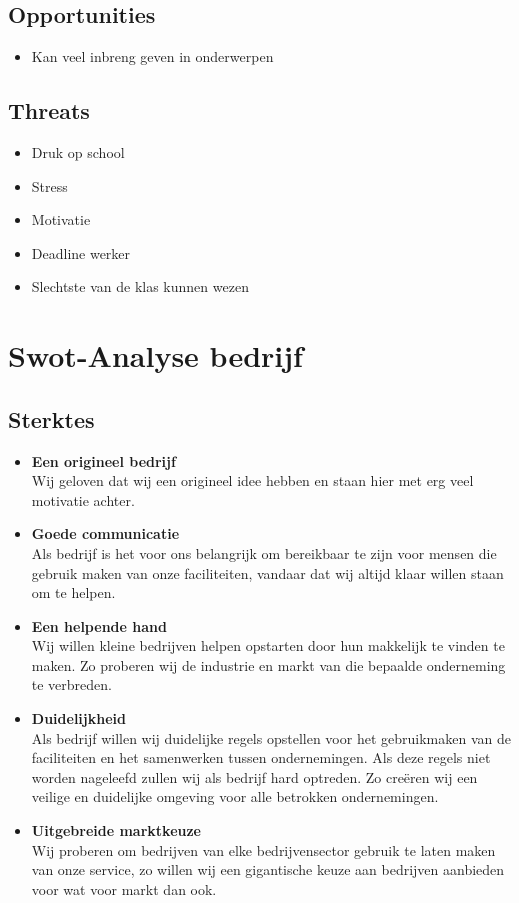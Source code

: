 \subsection{Opportunities}
\begin{itemize}
\item
  Kan veel inbreng geven in onderwerpen
\end{itemize}

\subsection{Threats}
\begin{itemize}
\item
  Druk op school
\item
  Stress
\item
  Motivatie
\item
  Deadline werker
\item
  Slechtste van de klas kunnen wezen
\end{itemize}

\section{Swot-Analyse bedrijf}

\subsection{Sterktes}
\begin{itemize}
\item {\bf Een origineel bedrijf} \\
  Wij geloven dat wij een origineel idee hebben en staan hier met erg veel motivatie achter.
\item {\bf Goede communicatie} \\
  Als bedrijf is het voor ons belangrijk om bereikbaar te zijn voor mensen die gebruik maken van onze faciliteiten, vandaar dat wij altijd klaar willen staan om te helpen.
\item {\bf Een helpende hand} \\
  Wij willen kleine bedrijven helpen opstarten door hun makkelijk te vinden te maken. Zo proberen wij de industrie en markt van die bepaalde onderneming te verbreden.
\item {\bf Duidelijkheid} \\
  Als bedrijf willen wij duidelijke regels opstellen voor het gebruikmaken van de faciliteiten en het samenwerken tussen ondernemingen. Als deze regels niet worden nageleefd zullen wij als bedrijf hard optreden. Zo creëren wij een veilige en duidelijke omgeving voor alle betrokken ondernemingen.
\item {\bf Uitgebreide marktkeuze} \\
  Wij proberen om bedrijven van elke bedrijvensector gebruik te laten maken van onze service, zo willen wij een gigantische keuze aan bedrijven aanbieden voor wat voor markt dan ook.
\end{itemize}

